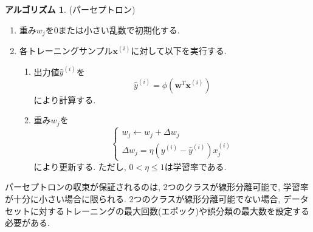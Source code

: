 \documentclass[uplatex]{jsarticle}
\theoremstyle{definition}
\newtheorem{algorithm}[definition]{アルゴリズム}
\numberwithin{equation}{section}
\begin{document}
\begin{algorithm}
    (パーセプトロン)
    \begin{enumerate}
        \item
        重み$w_{j}$を$0$または小さい乱数で初期化する.
        \item
        各トレーニングサンプル$\bm{x}^{(i)}$に対して以下を実行する.
            \begin{enumerate}
                \item
                出力値$\hat{y}^{(i)}$を
                \begin{equation}
                    \hat{y}^{(i)} = \phi(\bm{w}^{T}\bm{x}^{(i)})
                \end{equation}
                により計算する.
                \item
                重み$w_{j}$を
                \begin{equation}
                    \begin{cases}
                        w_{j} \leftarrow w_{j} + \Delta w_{j} \\
                        \Delta w_{j} = \eta(y^{(i)} - \hat{y}^{(i)})x^{(i)}_{j}
                    \end{cases}
                \end{equation}
                により更新する.
                ただし, $0 < \eta \leq 1$は学習率である.
            \end{enumerate}
    \end{enumerate}
\end{algorithm}
パーセプトロンの収束が保証されるのは, 2つのクラスが線形分離可能で, 学習率が十分に小さい場合に限られる.
2つのクラスが線形分離可能でない場合, データセットに対するトレーニングの最大回数(エポック)や誤分類の最大数を設定する必要がある.
\end{document}
